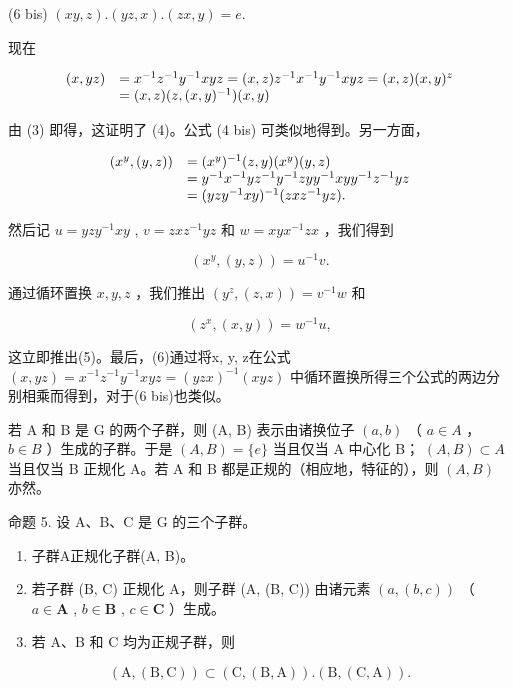 (6 bis) \((xy, z). (yz, x). (zx, y) = e.\)

现在

\[
\begin{array}{r l} (x, y z) & = x ^ {- 1} z ^ {- 1} y ^ {- 1} x y z = (x, z) z ^ {- 1} x ^ {- 1} y ^ {- 1} x y z = (x, z) (x, y) ^ {z} \\ & = (x, z) (z, (x, y) ^ {- 1}) (x, y) \end{array}
\]

由 (3) 即得，这证明了 (4)。公式 (4 bis) 可类似地得到。另一方面，

\[
\begin{array}{r l} (x ^ {y}, (y, z)) & = (x ^ {y}) ^ {- 1} (z, y) (x ^ {y}) (y, z) \\ & = y ^ {- 1} x ^ {- 1} y z ^ {- 1} y ^ {- 1} z y y ^ {- 1} x y y ^ {- 1} z ^ {- 1} y z \\ & = (y z y ^ {- 1} x y) ^ {- 1} (z x z ^ {- 1} y z). \end{array}
\]

然后记 \(u = yzy^{-1}xy\) , \(v = zxz^{-1}yz\) 和 \(w = xyx^{-1}zx\) ，我们得到

\[
(x ^ {y}, (y, z)) = u ^ {- 1} v.
\]

通过循环置换 \(x, y, z\) ，我们推出 \((y^z, (z, x)) = v^{-1}w\) 和

\[
\left(z ^ {x}, (x, y)\right) = w ^ {- 1} u,
\]

这立即推出(5)。最后，(6)通过将x, y, z在公式 \((x, yz) = x^{-1}z^{-1}y^{-1}xyz = (yzx)^{-1}(xyz)\) 中循环置换所得三个公式的两边分别相乘而得到，对于(6 bis)也类似。

若 A 和 B 是 G 的两个子群，则 (A, B) 表示由诸换位子 \((a, b)\) （ \(a \in A\) ， \(b \in B\) ）生成的子群。于是 \((A, B) = \{e\}\) 当且仅当 A 中心化 B； \((A, B) \subset A\) 当且仅当 B 正规化 A。若 A 和 B 都是正规的（相应地，特征的），则 \((A, B)\) 亦然。

命题 5. 设 A、B、C 是 G 的三个子群。

\begin{enumerate}
\def\labelenumi{(\roman{enumi})}
\item
  子群A正规化子群(A, B)。
\item
  若子群 (B, C) 正规化 A，则子群 (A, (B, C)) 由诸元素 \((a, (b, c))\) （ \(a \in \mathbf{A}\) , \(b \in \mathbf{B}\) , \(c \in \mathbf{C}\) ）生成。
\item
  若 A、B 和 C 均为正规子群，则
\end{enumerate}

\[
(\mathrm{A}, (\mathrm{B}, \mathrm{C})) \subset (\mathrm{C}, (\mathrm{B}, \mathrm{A})). (\mathrm{B}, (\mathrm{C}, \mathrm{A})).
\]

